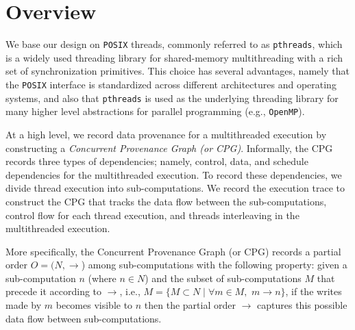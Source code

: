 \section{Overview}
\label{sec:overview}
%

We base our design on {\tt POSIX} threads, commonly referred to as
{\tt pthreads}, which is a widely used threading library for shared-memory
multithreading with a rich set of synchronization primitives.  This
choice has several advantages, namely that the {\tt POSIX} interface
is standardized across different architectures and operating systems, and also that {\tt pthreads} is used as the underlying threading
library for many higher level abstractions for parallel programming
(e.g., {\tt OpenMP}).




 At a high level, we record data provenance for a multithreaded execution by constructing a {\em Concurrent Provenance Graph (or CPG)}. Informally,  the CPG records three types of dependencies; namely, control, data, and schedule dependencies for the multithreaded execution. To record these dependencies, we divide thread execution into sub-computations. We record the execution trace to construct the CPG that tracks the data flow between the sub-computations, control flow for each thread execution, and threads interleaving  in the multithreaded execution.

More specifically, the Concurrent Provenance Graph (or CPG) records a partial order $O = (N, \rightarrow$) among sub-computations with the following property: given a sub-computation $n$ (where $n \in N $)  and the subset of sub-computations $M$ that precede it according to $\rightarrow$, i.e., $M = \{M \subset N \mid \forall m \in M,$ $m \rightarrow n\}$, if the writes made by $m$ becomes visible to $n$ then the partial order $\rightarrow$ captures this possible data flow between sub-computations.




